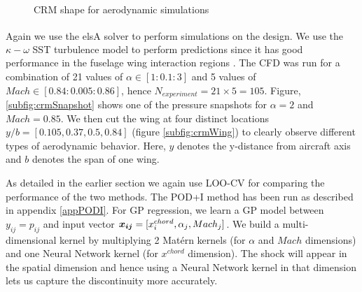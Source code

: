 \begin{figure}[!ht]
  \centering
  \quad
  \caption{CRM shape for aerodynamic simulations}
\end{figure}

Again we use the elsA\textsuperscript{\textregistered} solver to perform simulations on the design. We use the $\kappa - \omega$ SST turbulence model to perform predictions since it has good performance in the fuselage wing interaction regions \cite{menter2003ten, vassberg2014summary}. The CFD was run for a combination of 21 values of $\alpha \in [1: 0.1: 3]$ and 5 values of $Mach \in [0.84: 0.005: 0.86]$, hence $N_{experiment} = 21\times5 = 105$. Figure, \ref{subfig:crmSnapshot} shows one of the pressure snapshots for $\alpha = 2$ and $Mach = 0.85$. We then cut the wing at four distinct locations $y/b = [0.105, 0.37, 0.5, 0.84]$ (figure \ref{subfig:crmWing}) to clearly observe different types of aerodynamic behavior. Here, $y$ denotes the y-distance from aircraft axis and $b$ denotes the span of one wing. 

As detailed in the earlier section we again use LOO-CV for comparing the performance of the two methods. The POD+I method has been run as described in appendix \ref{appPODI}. For GP regression, we learn a GP model between $y_{ij} = p_{ij}$ and input vector $\boldsymbol{x_{ij}} = [x^{chord}_i, \alpha_j, Mach_j]$. We build a multi-dimensional kernel by multiplying 2 Mat\'ern kernels (for $\alpha$ and $Mach$ dimensions) and one Neural Network kernel (for $x^{chord}$ dimension). The shock will appear in the spatial dimension and hence using a Neural Network kernel in that dimension lets us capture the discontinuity more accurately. 

